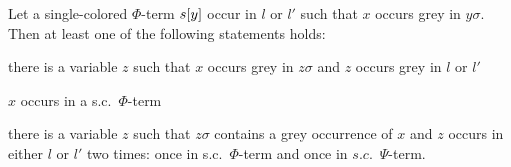 \documentclass[,%
	draft=false,%
	numbers=noendperiod
	11pt,
	a4paper,
	oneside,%
	openany,
]{memoir}
\begin{document}
\begin{lemma}
	\label{lemma:colored_y_sigma_contains_grey_x}
	Let a single-colored $\Phi$-term $s[y]$ occur in $l$ or $l'$ such that $x$ occurs grey in $y\sigma$.
	Then at least one of the following statements holds:
	\begin{compactenum}
	\item
		there is a variable $z$ such that $x$ occurs grey in $z\sigma$ and $z$ occurs grey in $l$ or $l'$
		\label{27_z_grey}
	\item $x$ occurs in a s.c.\ $\Phi$-term \label{27_x_in_sc_phi}
	\item there is a variable $z$ such that $z\sigma$ contains a grey occurrence of $x$ and $z$ occurs in either $l$ or $l'$ two times: once in s.c.\ $\Phi$-term and once in $s.c.$\ $\Psi$-term.
		\label{27_mixed}

	\end{compactenum}
\end{lemma}
\end{document}
